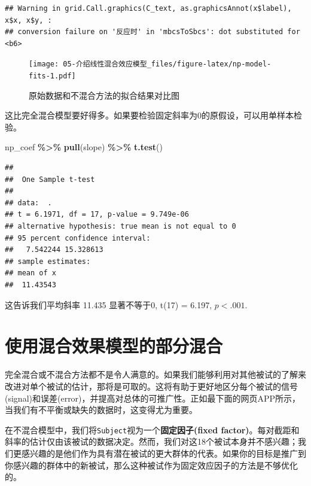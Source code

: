 \documentclass[
]{book}
\newenvironment{Shaded}{\begin{snugshade}}{\end{snugshade}}
\newcommand{\FunctionTok}[1]{\textcolor[rgb]{0.13,0.29,0.53}{\textbf{#1}}}
\newcommand{\NormalTok}[1]{#1}
\newcommand{\SpecialCharTok}[1]{\textcolor[rgb]{0.81,0.36,0.00}{\textbf{#1}}}
\begin{document}
\begin{verbatim}
## Warning in grid.Call.graphics(C_text, as.graphicsAnnot(x$label), x$x, x$y, :
## conversion failure on '反应时' in 'mbcsToSbcs': dot substituted for <b6>
\end{verbatim}

\begin{figure}
\centering
\texttt{[image: 05-介绍线性混合效应模型\_files/figure-latex/np-model-fits-1.pdf]}
\caption{\label{fig:np-model-fits}原始数据和不混合方法的拟合结果对比图}
\end{figure}

这比完全混合模型要好得多。如果要检验固定斜率为0的原假设，可以用单样本检验。

\begin{Shaded}
\begin{Highlighting}[]
\NormalTok{np\_coef }\SpecialCharTok{\%\textgreater{}\%} \FunctionTok{pull}\NormalTok{(slope) }\SpecialCharTok{\%\textgreater{}\%} \FunctionTok{t.test}\NormalTok{()}
\end{Highlighting}
\end{Shaded}

\begin{verbatim}
## 
##  One Sample t-test
## 
## data:  .
## t = 6.1971, df = 17, p-value = 9.749e-06
## alternative hypothesis: true mean is not equal to 0
## 95 percent confidence interval:
##   7.542244 15.328613
## sample estimates:
## mean of x 
##  11.43543
\end{verbatim}

这告诉我们平均斜率
11.435
显著不等于0,
t(17) = 6.197, \(p < .001\).

\hypertarget{ux4f7fux7528ux6df7ux5408ux6548ux679cux6a21ux578bux7684ux90e8ux5206ux6df7ux5408}{%
\section{使用混合效果模型的部分混合}\label{ux4f7fux7528ux6df7ux5408ux6548ux679cux6a21ux578bux7684ux90e8ux5206ux6df7ux5408}}

完全混合或不混合方法都不是令人满意的。如果我们能够利用对其他被试的了解来改进对单个被试的估计，那将是可取的。这将有助于更好地区分每个被试的信号(signal)和误差(error)，并提高对总体的可推广性。正如最下面的网页APP所示，当我们有不平衡或缺失的数据时，这变得尤为重要。

在不混合模型中，我们将\texttt{Subject}视为一个\textbf{固定因子(fixed factor)}。每对截距和斜率的估计仅由该被试的数据决定。然而，我们对这18个被试本身并不感兴趣；我们更感兴趣的是他们作为具有潜在被试的更大群体的代表。如果你的目标是推广到你感兴趣的群体中的新被试，那么这种被试作为固定效应因子的方法是不够优化的。
\end{document}
